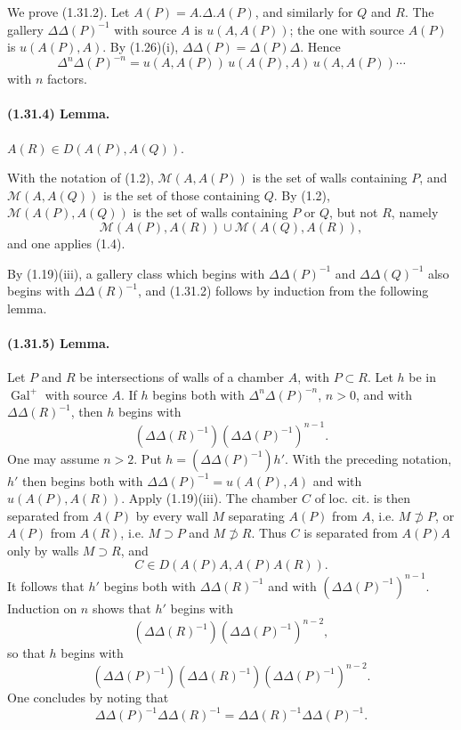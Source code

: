 \documentclass[10pt]{article}
\begin{document}
We prove (1.31.2). Let \(A(P)=A.\Delta.A(P)\), and similarly for \(Q\) and \(R\). The gallery \(\Delta\Delta(P)^{-1}\) with source \(A\) is \(u(A,A(P))\); the one with source \(A(P)\) is \(u(A(P),A)\). By (1.26)(i), \(\Delta\Delta(P)=\Delta(P)\Delta\). Hence
\[
\tag{1.31.3}
\Delta^n\Delta(P)^{-n}=u(A,A(P))\,u(A(P),A)\,u(A,A(P))\cdots
\]
with \(n\) factors.

\paragraph{(1.31.4) Lemma.} \(A(R)\in D(A(P),A(Q))\).

With the notation of (1.2), \(\mathcal M(A,A(P))\) is the set of walls containing \(P\), and \(\mathcal M(A,A(Q))\) is the set of those containing \(Q\). By (1.2), \(\mathcal M(A(P),A(Q))\) is the set of walls containing \(P\) or \(Q\), but not \(R\), namely
\[
\mathcal M(A(P),A(R))\cup \mathcal M(A(Q),A(R)),
\]
and one applies (1.4).

By (1.19)(iii), a gallery class which begins with \(\Delta\Delta(P)^{-1}\) and \(\Delta\Delta(Q)^{-1}\) also begins with \(\Delta\Delta(R)^{-1}\), and (1.31.2) follows by induction from the following lemma.

\paragraph{(1.31.5) Lemma.} Let \(P\) and \(R\) be intersections of walls of a chamber \(A\), with \(P\subset R\). Let \(h\) be in \(\operatorname{Gal}^+\) with source \(A\). If \(h\) begins both with \(\Delta^n\Delta(P)^{-n}\), \(n>0\), and with \(\Delta\Delta(R)^{-1}\), then \(h\) begins with
\[
(\Delta\Delta(R)^{-1})(\Delta\Delta(P)^{-1})^{n-1}.
\]
One may assume \(n>2\). Put \(h=(\Delta\Delta(P)^{-1})h'\). With the preceding notation, \(h'\) then begins both with \(\Delta\Delta(P)^{-1}=u(A(P),A)\) and with \(u(A(P),A(R))\). Apply (1.19)(iii). The chamber \(C\) of loc. cit. is then separated from \(A(P)\) by every wall \(M\) separating \(A(P)\) from \(A\), i.e. \(M\not\supset P\), or \(A(P)\) from \(A(R)\), i.e. \(M\supset P\) and \(M\not\supset R\). Thus \(C\) is separated from \(A(P)A\) only by walls \(M\supset R\), and
\[
C\in D(A(P)A,A(P)A(R)).
\]
It follows that \(h'\) begins both with \(\Delta\Delta(R)^{-1}\) and with \((\Delta\Delta(P)^{-1})^{n-1}\). Induction on \(n\) shows that \(h'\) begins with
\[
(\Delta\Delta(R)^{-1})(\Delta\Delta(P)^{-1})^{n-2},
\]
so that \(h\) begins with
\[
(\Delta\Delta(P)^{-1})(\Delta\Delta(R)^{-1})(\Delta\Delta(P)^{-1})^{n-2}.
\]
One concludes by noting that
\[
\Delta\Delta(P)^{-1}\Delta\Delta(R)^{-1}
=\Delta\Delta(R)^{-1}\Delta\Delta(P)^{-1}.
\]
\end{document}
